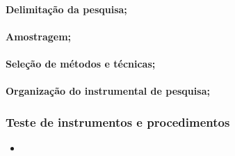 \documentclass[
]{book}
\providecommand{\tightlist}{%
  \setlength{\itemsep}{0pt}\setlength{\parskip}{0pt}}
\begin{document}
\hypertarget{delimitauxe7uxe3o-da-pesquisa}{%
\paragraph{Delimitação da
pesquisa;}\label{delimitauxe7uxe3o-da-pesquisa}}

\hypertarget{amostragem}{%
\paragraph{Amostragem;}\label{amostragem}}

\hypertarget{seleuxe7uxe3o-de-muxe9todos-e-tuxe9cnicas}{%
\paragraph{Seleção de métodos e
técnicas;}\label{seleuxe7uxe3o-de-muxe9todos-e-tuxe9cnicas}}

\hypertarget{organizauxe7uxe3o-do-instrumental-de-pesquisa}{%
\paragraph{Organização do instrumental de
pesquisa;}\label{organizauxe7uxe3o-do-instrumental-de-pesquisa}}

\hypertarget{teste-de-instrumentos-e-procedimentos}{%
\subsubsection{Teste de instrumentos e
procedimentos}\label{teste-de-instrumentos-e-procedimentos}}

\begin{itemize}
\tightlist
\item
\end{itemize}

\backmatter
\end{document}
